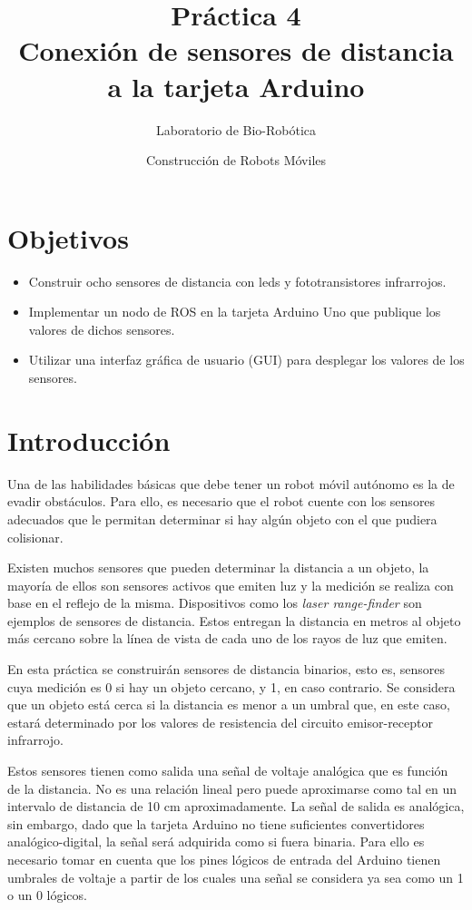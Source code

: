 \documentclass[a4paper,12pt]{article}
\title{Práctica 4 \\ Conexión de sensores de distancia a la tarjeta Arduino}
\author{Laboratorio de Bio-Robótica}
\date{Construcción de Robots Móviles}
\begin{document}
\renewcommand{\tablename}{Tabla}
\maketitle
\section*{Objetivos}
\begin{itemize}
\item Construir ocho sensores de distancia con leds y fototransistores infrarrojos. 
\item Implementar un nodo de ROS en la tarjeta Arduino Uno que publique los valores de dichos sensores.
\item Utilizar una interfaz gráfica de usuario (GUI) para desplegar los valores de los sensores. 
\end{itemize}

\section{Introducción}
Una de las habilidades básicas que debe tener un robot móvil autónomo es la de evadir obstáculos. Para ello, es necesario que el robot cuente con los sensores adecuados que le permitan determinar si hay algún objeto con el que pudiera colisionar. 

Existen muchos sensores que pueden determinar la distancia a un objeto, la mayoría de ellos son sensores activos que emiten luz y la medición se realiza con base en el reflejo de la misma. Dispositivos como los \textit{laser range-finder} son ejemplos de sensores de distancia. Estos entregan la distancia en metros al objeto más cercano sobre la línea de vista de cada uno de los rayos de luz que emiten. 

En esta práctica se construirán sensores de distancia binarios, esto es, sensores cuya medición es 0 si hay un objeto cercano, y 1, en caso contrario. Se considera que un objeto está cerca si la distancia es menor a un umbral que, en este caso, estará determinado por los valores de resistencia del circuito emisor-receptor infrarrojo. 

Estos sensores tienen como salida una señal de voltaje analógica que es función de la distancia. No es una relación lineal pero puede aproximarse como tal en un intervalo de distancia de 10 cm aproximadamente. La señal de salida es analógica, sin embargo, dado que la tarjeta Arduino no tiene suficientes convertidores analógico-digital, la señal será adquirida como si fuera binaria. Para ello es necesario tomar en cuenta que los pines lógicos de entrada del Arduino tienen umbrales de voltaje a partir de los cuales una señal se considera ya sea como un 1 o un 0 lógicos. 
\end{document}
